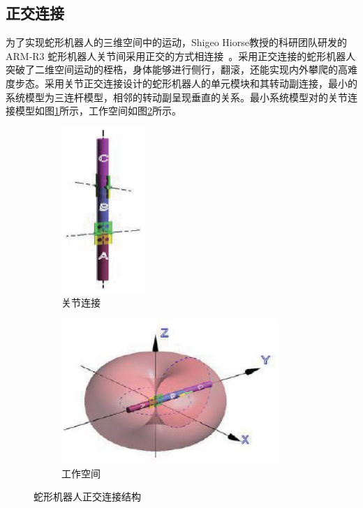 \subsection{正交连接}
为了实现蛇形机器人的三维空间中的运动，Shigeo Hiorse教授的科研团队研发的ARM-R3 蛇形机器人关节间采用正交的方式相连接~\cite{Prautsch1999Control}。采用正交连接的蛇形机器人突破了二维空间运动的桎梏，身体能够进行侧行，翻滚，还能实现内外攀爬的高难度步态。采用关节正交连接设计的蛇形机器人的单元模块和其转动副连接，最小的系统模型为三连杆模型，相邻的转动副呈现垂直的关系。最小系统模型对的关节连接模型如图\ref{fig:orconnect}所示，工作空间如图\ref{fig:orspace}所示。
\begin{figure}[h!] %
	\begin{subfigure}{0.5\textwidth}
		\centering
		\includegraphics[width=0.35\textwidth,height=0.15\textheight]{figure/chap03/struct.eps}
		\caption{关节连接}
		\label{fig:orconnect}
	\end{subfigure}
	\begin{subfigure}{0.5\textwidth}
		\centering
		\includegraphics[width=0.9\textwidth,height=0.15\textheight]{figure/chap03/space.eps}
		\caption{工作空间}
		\label{fig:orspace}
	\end{subfigure}
	\caption{蛇形机器人正交连接结构}
	\label{fig:Orthogonal}
\end{figure}
